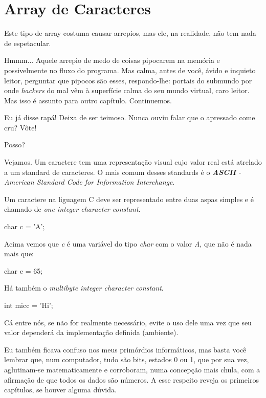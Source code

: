 \section{Array de Caracteres}
Este tipo de array costuma causar arrepios, mas ele, na realidade, não tem nada
de espetacular.


Hmmm... Aquele arrepio de medo de coisas pipocarem na memória e possivelmente
no fluxo do programa. Mas calma, antes de você, ávido e inquieto leitor,
perguntar que pipocos são esses, respondo-lhe: portais do submundo por onde
\textit{hackers} do mal vêm à superfície calma do seu mundo virtual, caro
leitor. Mas isso é assunto para outro capítulo. Continuemos.


Eu já disse rapá! Deixa de ser teimoso. Nunca ouviu falar que o apressado come
cru? Vôte!

Posso?


Vejamos. Um caractere tem uma representação visual cujo valor real está
atrelado a um standard de caracteres. O mais comum desses standards é o
\textit{\textbf{ASCII} - American Standard Code for Information Interchange}.

Um caractere na liguagem C deve ser representado entre duas aspas simples e é
chamado de \textit{one integer character constant}.

\begin{ccode}
  char c = 'A';
\end{ccode}

Acima vemos que \textit{c} é uma variável do tipo \textit{char} com o valor
\textit{A}, que não é nada mais que:

\begin{ccode}
  char c = 65;
\end{ccode}

Há também o \textit{multibyte integer character constant}.

\begin{ccode}
  int micc = 'Hi';
\end{ccode}

Cá entre nós, se não for realmente necessário, evite o uso dele uma vez que seu
valor dependerá da implementação definida (ambiente).


Eu também ficava confuso nos meus primórdios informáticos, mas basta você
lembrar que, num computador, tudo são bits, estados 0 ou 1, que por sua vez,
aglutinam-se matematicamente e corroboram, numa concepção mais chula, com a
afirmação de que todos os dados são números. A esse respeito reveja os
primeiros capítulos, se houver alguma dúvida.

